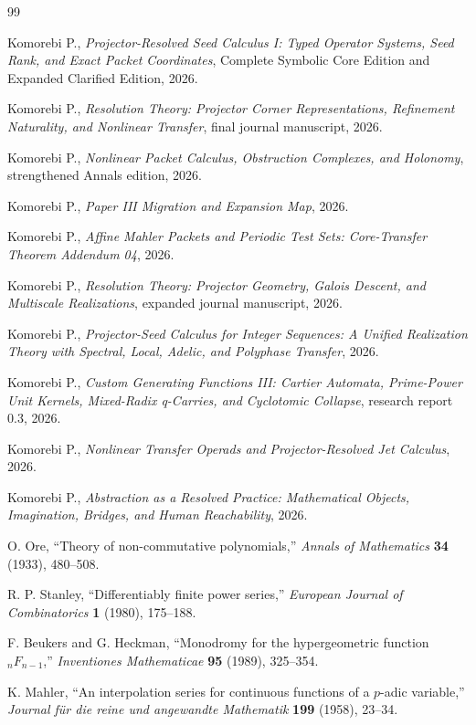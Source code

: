 \documentclass[11pt]{article}
\theoremstyle{definition}
\theoremstyle{remark}
\begin{document}
\clearpage
\begin{thebibliography}{99}

Komorebi P., \emph{Projector-Resolved Seed Calculus I: Typed Operator Systems, Seed Rank, and Exact Packet Coordinates}, Complete Symbolic Core Edition and Expanded Clarified Edition, 2026.

Komorebi P., \emph{Resolution Theory: Projector Corner Representations, Refinement Naturality, and Nonlinear Transfer}, final journal manuscript, 2026.

Komorebi P., \emph{Nonlinear Packet Calculus, Obstruction Complexes, and Holonomy}, strengthened Annals edition, 2026.

Komorebi P., \emph{Paper III Migration and Expansion Map}, 2026.

Komorebi P., \emph{Affine Mahler Packets and Periodic Test Sets: Core-Transfer Theorem Addendum 04}, 2026.

Komorebi P., \emph{Resolution Theory: Projector Geometry, Galois Descent, and Multiscale Realizations}, expanded journal manuscript, 2026.

Komorebi P., \emph{Projector-Seed Calculus for Integer Sequences: A Unified Realization Theory with Spectral, Local, Adelic, and Polyphase Transfer}, 2026.

Komorebi P., \emph{Custom Generating Functions III: Cartier Automata, Prime-Power Unit Kernels, Mixed-Radix q-Carries, and Cyclotomic Collapse}, research report 0.3, 2026.

Komorebi P., \emph{Nonlinear Transfer Operads and Projector-Resolved Jet Calculus}, 2026.

Komorebi P., \emph{Abstraction as a Resolved Practice: Mathematical Objects, Imagination, Bridges, and Human Reachability}, 2026.

O. Ore, ``Theory of non-commutative polynomials,'' \emph{Annals of Mathematics} \textbf{34} (1933), 480--508.

R. P. Stanley, ``Differentiably finite power series,'' \emph{European Journal of Combinatorics} \textbf{1} (1980), 175--188.

F. Beukers and G. Heckman, ``Monodromy for the hypergeometric function \({}_nF_{n-1}\),'' \emph{Inventiones Mathematicae} \textbf{95} (1989), 325--354.

K. Mahler, ``An interpolation series for continuous functions of a \(p\)-adic variable,'' \emph{Journal f\"ur die reine und angewandte Mathematik} \textbf{199} (1958), 23--34.


\end{thebibliography}
\end{document}
